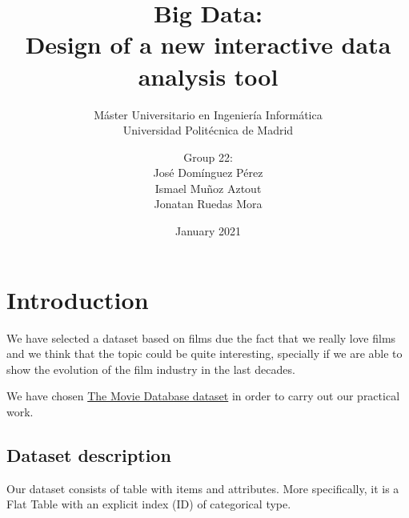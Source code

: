 

\title{Big Data:\\ Design of a new interactive data analysis tool}
\subtitle{Máster Universitario en Ingeniería Informática\\
		  Universidad Politécnica de Madrid}
\author{Group 22:\\
		José Domínguez Pérez\\
		Ismael Muñoz Aztout\\
		Jonatan Ruedas Mora}
\date{January 2021}

\makeindex

\maketitle
\tableofcontents
\newpage

\section{Introduction}

We have selected a dataset based on films due the fact that we really love films and we think that the topic could be quite interesting, specially if we are able to show the evolution of the film industry in the last decades.

We have chosen \href{https://www.kaggle.com/tmdb/tmdb-movie-metadata?select=tmdb_5000_movies.csv}{The Movie Database dataset} in order to carry out our practical work.

\subsection{Dataset description}
Our dataset consists of table with items and attributes. More specifically, it is a Flat Table with an explicit index (ID) of categorical type. 

